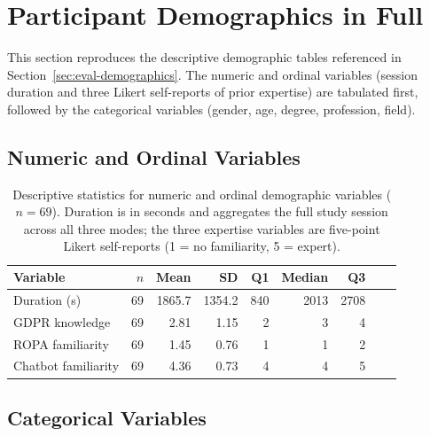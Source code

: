 \section{Participant Demographics in Full}
\label{app:demographics}

This section reproduces the descriptive demographic tables
referenced in Section~\ref{sec:eval-demographics}. The numeric and
ordinal variables (session duration and three Likert self-reports
of prior expertise) are tabulated first, followed by the
categorical variables (gender, age, degree, profession, field).

\subsection{Numeric and Ordinal Variables}
\label{app:demographics-numeric}

\begin{table}[htbp]
\centering
\caption{Descriptive statistics for numeric and ordinal demographic
variables ($n = 69$). Duration is in seconds and aggregates the full
study session across all three modes; the three expertise variables
are five-point Likert self-reports (1 = no familiarity, 5 = expert).}
\label{tab:demographics-numeric}
\small
\begin{tabular}{@{}l r r r r r r r r@{}}
\toprule
Variable & $n$ & Mean & SD & Q1 & Median & Q3 \\
\midrule
Duration (s)         & 69 & 1865.7 & 1354.2 & 840 & 2013 & 2708 \\
GDPR knowledge       & 69 & 2.81  & 1.15  & 2   & 3    & 4 \\
ROPA familiarity     & 69 & 1.45  & 0.76  & 1   & 1    & 2 \\
Chatbot familiarity  & 69 & 4.36  & 0.73  & 4   & 4    & 5 \\
\bottomrule
\end{tabular}
\end{table}

\subsection{Categorical Variables}
\label{app:demographics-categorical}

